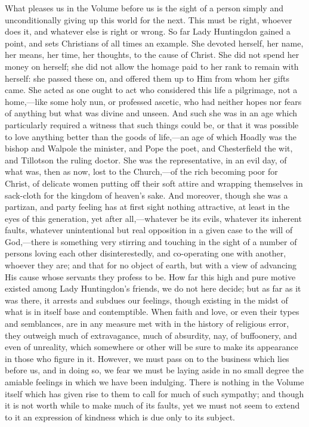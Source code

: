 What pleases us in the Volume before us is the
sight of a person simply and unconditionally giving up this world for
the next. This must be right, whoever does it, and whatever else is
right or wrong. So far Lady Huntingdon gained a point, and sets
Christians of all times an example. She devoted herself, her name, her
means, her time, her thoughts, to the cause of Christ. She did not
spend her money on herself; she did not allow the homage paid to her
rank to remain with herself: she passed these on, and offered them up
to Him from whom her gifts came. She acted as one ought to act
who considered this life a pilgrimage, not a home,—like some holy
nun, or professed ascetic, who had neither hopes nor fears of anything
but what was divine and unseen. And such she was in an age which
particularly required a witness that such things could be, or that it
was possible to love anything better than the goods of life,—an age
of which Hoadly was the bishop and Walpole the minister, and Pope the
poet, and Chesterfield the wit, and Tillotson the ruling doctor. She
was the representative, in an evil day, of what was, then as now, lost
to the Church,—of the rich becoming poor for Christ, of delicate
women putting off their soft attire and wrapping themselves in
sack-cloth for the kingdom of heaven's sake. And moreover, though she
was a partizan, and party feeling has at first sight nothing
attractive, at least in the eyes of this generation, yet after
all,—whatever be its evils, whatever its inherent faults, whatever
unintentional but real opposition in a given case to the will of
God,—there is something very stirring and touching in the sight of a
number of persons loving each other disinterestedly, and co-operating
one with another, whoever they are; and that for no object of earth,
but with a view of advancing His cause whose servants they profess to
be. How far this high and pure motive existed among Lady Huntingdon's
friends, we do not here decide; but as far as it was there, it arrests
and subdues our feelings, though existing in the midst of what is in
itself base and contemptible. When faith and love, or even their types
and semblances, are in any measure met with in the history of
religious error, they outweigh much of extravagance, much of
absurdity, nay, of buffoonery, and even of unreality, which somewhere
or other will be sure to make its appearance in those who figure
in it. However, we must pass on to the business which lies before us,
and in doing so, we fear we must be laying aside in no small degree
the amiable feelings in which we have been indulging. There is nothing
in the Volume itself which has given rise to them to call for much of
such sympathy; and though it is not worth while to make much of its
faults, yet we must not seem to extend to it an expression of kindness
which is due only to its subject.

